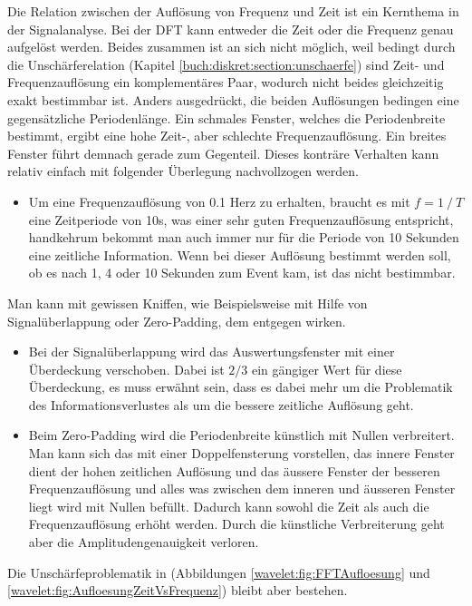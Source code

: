Die Relation zwischen der Auflösung von Frequenz und Zeit ist ein Kernthema in der Signalanalyse. Bei der DFT kann entweder die Zeit oder die Frequenz genau aufgelöst werden. Beides zusammen ist an sich nicht möglich,
weil bedingt durch die Unschärferelation (Kapitel \ref{buch:diskret:section:unschaerfe}) sind Zeit- und Frequenzauflösung ein komplementäres Paar, wodurch nicht beides gleichzeitig exakt bestimmbar ist. Anders ausgedrückt, die beiden Auflösungen bedingen eine gegensätzliche Periodenlänge. Ein schmales Fenster, welches die Periodenbreite bestimmt, ergibt eine hohe Zeit-, aber schlechte Frequenzauflösung. Ein breites Fenster führt demnach gerade zum Gegenteil.
Dieses konträre Verhalten kann relativ einfach mit folgender Überlegung nachvollzogen werden.
\begin{itemize}
\item Um eine Frequenzauflösung von 0.1 Herz zu erhalten, braucht es mit $f=1⁄T$ eine Zeitperiode von 10s, was einer sehr guten Frequenzauflösung entspricht, handkehrum bekommt man auch immer nur für die Periode von 10 Sekunden eine zeitliche Information. Wenn bei dieser Auflösung bestimmt werden soll, ob es nach 1, 4 oder 10 Sekunden zum Event kam, ist das nicht bestimmbar.
\end{itemize}
 
Man kann mit gewissen Kniffen, wie Beispielsweise mit Hilfe von Signalüberlappung oder Zero-Padding, dem entgegen wirken.
\begin{itemize}
	\item Bei der Signalüberlappung wird das Auswertungsfenster mit einer Überdeckung verschoben. Dabei ist $2/3$ ein gängiger Wert für diese Überdeckung, es muss erwähnt sein, dass es dabei mehr um die Problematik des Informationsverlustes als um die bessere zeitliche Auflösung geht.
	\item Beim Zero-Padding wird die Periodenbreite künstlich mit Nullen verbreitert. Man kann sich das mit einer Doppelfensterung vorstellen, das innere Fenster dient der hohen zeitlichen Auflösung und das äussere Fenster der besseren Frequenzauflösung und alles was zwischen dem inneren und äusseren Fenster liegt wird mit Nullen befüllt. Dadurch kann sowohl die Zeit als auch die Frequenzauflösung erhöht werden. Durch die künstliche Verbreiterung geht aber die Amplitudengenauigkeit verloren.
\end{itemize}
Die Unschärfeproblematik in (Abbildungen \ref{wavelet:fig:FFTAufloesung} und \ref{wavelet:fig:AufloesungZeitVsFrequenz}) bleibt aber bestehen.

